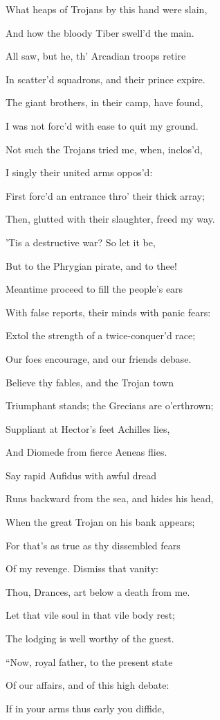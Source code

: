 What heaps of Trojans by this hand were slain,

And how the bloody Tiber swell’d the main.

All saw, but he, th’ Arcadian troops retire

In scatter’d squadrons, and their prince expire.

The giant brothers, in their camp, have found,

I was not forc’d with ease to quit my ground.

Not such the Trojans tried me, when, inclos’d,

I singly their united arms oppos’d:

First forc’d an entrance thro’ their thick array;

Then, glutted with their slaughter, freed my way.

’Tis a destructive war? So let it be,

But to the Phrygian pirate, and to thee!

Meantime proceed to fill the people’s ears

With false reports, their minds with panic fears:

Extol the strength of a twice-conquer’d race;

Our foes encourage, and our friends debase.

Believe thy fables, and the Trojan town

Triumphant stands; the Grecians are o’erthrown;

Suppliant at Hector’s feet Achilles lies,

And Diomede from fierce Aeneas flies.

Say rapid Aufidus with awful dread

Runs backward from the sea, and hides his head,

When the great Trojan on his bank appears;

For that’s as true as thy dissembled fears

Of my revenge. Dismiss that vanity:

Thou, Drances, art below a death from me.

Let that vile soul in that vile body rest;

The lodging is well worthy of the guest.

“Now, royal father, to the present state

Of our affairs, and of this high debate:

If in your arms thus early you diffide,

